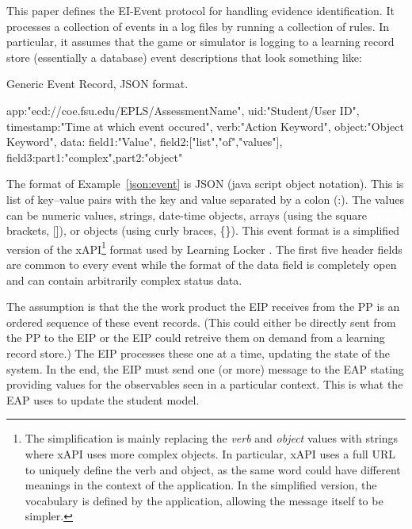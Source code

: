 \documentclass{article}
\begin{document}
  This paper defines the EI-Event protocol for handling evidence
  identification.  It processes a collection of events in a log files
  by running a collection of rules.  In particular, it assumes that
  the game or simulator is logging to a learning record store
  (essentially a database) event descriptions that look something
  like:
  
  \begin{algorithm}
    \caption{Generic Event Record, JSON format.}
    \label{json:event}
    \begin{listing}
      {
        app:"ecd://coe.fsu.edu/EPLS/AssessmentName",
        uid:"Student/User ID",
        timestamp:"Time at which event occured",
        verb:"Action Keyword",
        object:"Object Keyword",
        data:{
          field1:"Value",
          field2:["list","of","values"],
          field3:{part1:"complex",part2:"object"}
        }
      }
  \end{listing}
  \end{algorithm}

  The format of Example~\ref{json:event} is JSON (java script object
  notation).  This is list of key--value pairs with the key and value
  separated by a colon (:).  The values can be numeric values,
  strings, date-time objects, arrays (using the square brackets, []),
  or objects (using curly braces, \{\}).  This event format is a
  simplified version of the xAPI\footnote{The simplification is mainly
    replacing the \emph{verb} and \emph{object} values with strings
    where xAPI uses more complex objects.  In particular, xAPI uses a
    full URL to uniquely define the verb and object, as the same word
    could have different meanings in the context of the application.
    In the simplified version, the vocabulary is defined by the
    application, allowing the message itself to be simpler.} format
  used by Learning Locker \cite{xAPI}.  The first five header fields
  are common to every event while the format of the data field is
  completely open and can contain arbitrarily complex status data.

  The assumption is that the the work product the EIP receives from
  the PP is an ordered sequence of these event records.  (This could
  either be directly sent from the PP to the EIP or the EIP could
  retreive them on demand from a learning record store.)  The EIP
  processes these one at a time, updating the state of the system.  In
  the end, the EIP must send one (or more) message to the EAP stating
  providing values for the observables seen in a particular context.
  This is what the EAP uses to update the student model.
  
\end{document}
